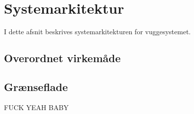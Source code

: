 \section{Systemarkitektur}

I dette afsnit beskrives systemarkitekturen for vuggesystemet.

\subsection*{Overordnet virkemåde}

\subsection*{Grænseflade}

FUCK YEAH BABY